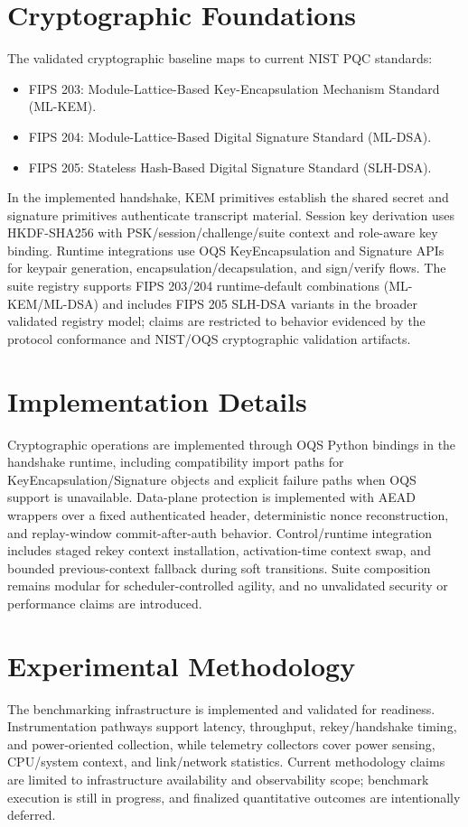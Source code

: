 \documentclass[conference]{IEEEtran}
\begin{document}
\section{Cryptographic Foundations}
The validated cryptographic baseline maps to current NIST PQC standards:
\begin{itemize}
\item FIPS 203: Module-Lattice-Based Key-Encapsulation Mechanism Standard (ML-KEM).
\item FIPS 204: Module-Lattice-Based Digital Signature Standard (ML-DSA).
\item FIPS 205: Stateless Hash-Based Digital Signature Standard (SLH-DSA).
\end{itemize}

In the implemented handshake, KEM primitives establish the shared secret and signature primitives authenticate transcript material. Session key derivation uses HKDF-SHA256 with PSK/session/challenge/suite context and role-aware key binding. Runtime integrations use OQS KeyEncapsulation and Signature APIs for keypair generation, encapsulation/decapsulation, and sign/verify flows. The suite registry supports FIPS 203/204 runtime-default combinations (ML-KEM/ML-DSA) and includes FIPS 205 SLH-DSA variants in the broader validated registry model; claims are restricted to behavior evidenced by the protocol conformance and NIST/OQS cryptographic validation artifacts.

\section{Implementation Details}
Cryptographic operations are implemented through OQS Python bindings in the handshake runtime, including compatibility import paths for KeyEncapsulation/Signature objects and explicit failure paths when OQS support is unavailable. Data-plane protection is implemented with AEAD wrappers over a fixed authenticated header, deterministic nonce reconstruction, and replay-window commit-after-auth behavior. Control/runtime integration includes staged rekey context installation, activation-time context swap, and bounded previous-context fallback during soft transitions. Suite composition remains modular for scheduler-controlled agility, and no unvalidated security or performance claims are introduced.

\section{Experimental Methodology}
The benchmarking infrastructure is implemented and validated for readiness. Instrumentation pathways support latency, throughput, rekey/handshake timing, and power-oriented collection, while telemetry collectors cover power sensing, CPU/system context, and link/network statistics. Current methodology claims are limited to infrastructure availability and observability scope; benchmark execution is still in progress, and finalized quantitative outcomes are intentionally deferred.
\end{document}
